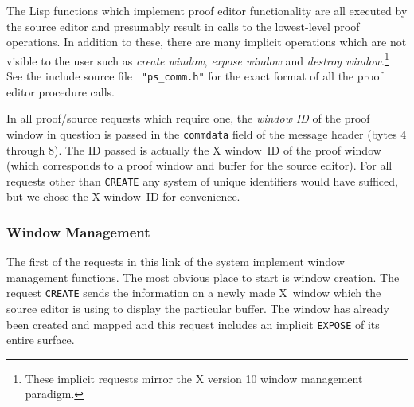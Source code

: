The Lisp functions which implement proof editor functionality are all
executed by the source editor and presumably result in calls to the
lowest-level proof operations.  In addition to these, there are many
implicit operations which are not visible to the user such as {\it
create window\/}, {\em expose window\/} and {\em destroy
window}.\footnote{These implicit requests mirror the X version 10
window management paradigm.} See the include source file {\tt
"ps\_comm.h"} for the exact format of all the proof editor procedure
calls.

In all proof/source requests which require one, the {\em window ID} of
the proof window in question is passed in the {\tt commdata} field of
the message header (bytes 4 through 8).  The ID passed is actually the
X window~ID of the proof window (which corresponds to a proof window
and buffer for the source editor).  For all requests other than
{\tt CREATE} any system of unique identifiers would have
sufficed, but we chose the X window~ID for convenience.

\subsubsection{Window Management}

The first of the requests in this link of the system implement window
management functions.  The most obvious place to start is window
creation.  The request {\tt CREATE} sends the information on a newly
made X~window which the source editor is using to display the
particular buffer.  The window has already been created and mapped
and this request includes an implicit {\tt EXPOSE} of its entire
surface.


